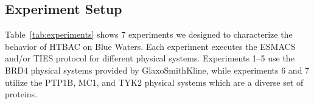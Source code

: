 
 

\subsection{Experiment Setup}\label{ssec:exp_design}

Table~\ref{tab:experiments} shows 7 experiments we designed to characterize
the behavior of HTBAC on Blue Waters. Each experiment executes the ESMACS
and/or TIES protocol for different physical systems. Experiments 1--5 use the
BRD4 physical systems provided by GlaxoSmithKline, while experiments 6 and 7
utilize the PTP1B, MC1, and TYK2 physical systems which are a diverse set of
proteins.

